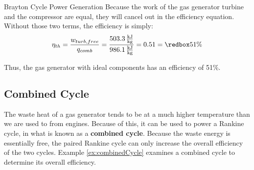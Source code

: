 \begin{example}[label=ex:turboshaft]{Brayton Cycle Power Generation}
  Because the work of the gas generator turbine and the compressor are equal, they will cancel out in the efficiency equation.  Without those two terms, the efficiency is simply:
  \begin{equation*}
    \eta_{th} = \frac{w_{turb, free}}{q_{comb}} = \frac{503.3\, \frac{\rm kJ}{\rm kg}}{986.1\, \frac{\rm kJ}{\rm kg}} = 0.51 = \redbox{51 \%}
  \end{equation*}

  Thus, the gas generator with ideal components has an efficiency of 51\%.
  
\end{example}

\subsection{Combined Cycle}
The waste heat of a gas generator tends to be at a much higher temperature than we are used to from engines.  Because of this, it can be used to power a Rankine cycle, in what is known as a {\bf combined cycle}.  Because the waste energy is essentially free, the paired Rankine cycle can only increase the overall efficiency of the two cycles.  Example \ref{ex:combinedCycle} examines a combined cycle to determine its overall efficiency.

